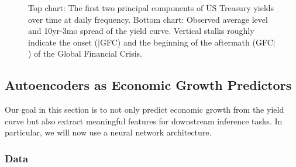 \documentclass{article}
\theoremstyle{plain}
\theoremstyle{definition}
\theoremstyle{remark}
\begin{document}
\begin{figure}


\caption{\label{fig-pca-yield}Top chart: The first two principal components of US Treasury yields over time at daily frequency. Bottom chart: Observed average level and 10yr-3mo spread of the yield curve. Vertical stalks roughly indicate the onset ($|$GFC) and the beginning of the aftermath (GFC$|$) of the Global Financial Crisis.}

\end{figure}%

\subsection{Autoencoders as Economic Growth Predictors}\label{example-deep-learning}


Our goal in this section is to not only predict economic growth from the yield curve but also extract meaningful features for downstream inference tasks. In particular, we will now use a neural network architecture.

\subsubsection{Data}\label{data}
\end{document}
